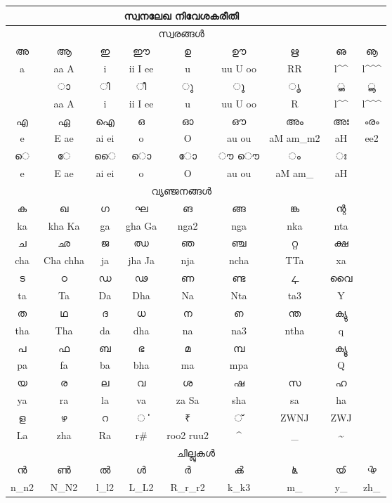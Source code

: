 \documentclass[a4paper]{article}
\makeatletter
\def\en{\color{black!80}\normalsize\En}
\def\mhat{\expandafter\@gobble\string\^}
\def\at{\expandafter\@gobble\string\@}
\def\tldchr{\expandafter\@gobble\string\~}
\def\undchr{\expandafter\@gobble\string\_}
\makeatother
\begin{document}
\Large

\centering

\begin{tabular}{|c|c|c|c|c|c|c|c|c|}
\multicolumn{8}{c}{സ്വനലേഖ നിവേശകരീതി}\\
\hline
\multicolumn{8}{c}{സ്വരങ്ങള്‍}\\
\hline
അ & ആ & ഇ & ഈ & ഉ & ഊ & ഋ & ഌ & ൡ \\
\en a &\en aa A &\en i &\en ii I ee &\en u &\en uu U oo 
        &\en RR & \en l\mhat\mhat & \en l\mhat\mhat\mhat \\
\hline
    & ാ & ി & ീ & ു & ൂ & ൃ & ൢ & ൣ \\
\en  &\en \at aa \at A &\en \at i &\en \at ii \at I \at ee &\en \at u &\en \at uu \at U \at oo
        &\en \at R & \en \at l\mhat\mhat &\en  \at l\mhat\mhat\mhat \\
\hline 
എ & ഏ & ഐ & ഒ & ഓ & ഔ & അം & അഃ & ൟ \\
\en e &\en E ae &\en ai ei &\en o &\en O &\en au ou &\en aM am\undchr\space m2 &\en aH & \en ee2 \\
\hline
െ & േ & ൈ &ൊ & ോ & ൗ ൌ &ം&  ഃ & \\
\en \at e &\en \at E \at ae &\en \at ai \at ei &\en \at o &\en \at O &\en  \at au  \at ou &\en \at aM am\undchr\space & \en \at aH  & \\
\hline
\multicolumn{8}{c}{വ്യഞ്ജനങ്ങള്‍}\\
\hline
ക & ഖ & ഗ & ഘ & ങ  & ങ്ങ & ങ്ക & ന്റ &\\
\en ka &\en kha Ka &\en ga &\en gha Ga& \en nga2 & \en nga &
 \en nka & \en nta &\\
\hline 
ച & ഛ & ജ & ഝ & ഞ & ഞ്ച & റ്റ  & ക്ഷ & \\
\en cha & \en Cha chha &\en ja &\en jha Ja &\en nja &\en ncha & \en TTa &\en xa &\\
\hline
ട & ഠ & ഡ & ഢ & ണ & ണ്ട & ഺ & വൈ &\\
\en ta & \en Ta &\en Da &\en Dha &\en Na & \en Nta & \en ta3 &\en Y &\\
\hline
ത & ഥ & ദ & ധ & ന & ഩ & ന്ത & ക്യു &\\
\en tha &\en Tha &\en da &\en dha & \en na & \en na3 & \en ntha & \en q &\\
\hline 
പ & ഫ & ബ & ഭ & മ & മ്പ &  & ക്യൂ  &\\
\en pa&\en fa &\en ba&\en bha & \en ma &\en mpa& & \en Q &\\
\hline
യ & ര & ല & വ & ശ & ഷ & സ & ഹ &\\
\en ya&\en ra&\en la &\en va&\en za Sa&\en sha &\en sa & \en ha &\\
\hline
ള & ഴ & റ & ൎ & ₹ & ്  &\en ZWNJ & \en ZWJ &\\
\en La &\en zha &\en Ra &\en r\# & \en roo2 ruu2 & \mhat & \undchr & \tldchr &\\
\hline
\multicolumn{9}{c}{ചില്ലുകള്‍}\\
\hline
ന്‍ & ണ്‍ & ല്‍ & ള്‍ & ര്‍ & ൿ & ൔ & ൕ & ൖ \\
\en n\undchr \space n2 &\en N\undchr \space N2 &\en l\undchr \space l2 &\en L\undchr \space L2 &\en R\undchr \space r\undchr \space r2
&\en k\undchr \space k3 & \en m\undchr & \en y\undchr & \en zh\undchr \\
\hline
\end{tabular} 
\end{document}
